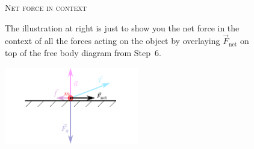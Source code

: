 \documentclass[10pt,letterpaper,twoside]{article}
\begin{document}
\FloatBarrier
\begin{figure}[h!]
  \begin{minipage}[l]{0.70\textwidth}
	{\Large\textsc{Net force in context}}{\quad}

	The illustration at right is just to show you the net force in the context of all the forces acting on the object by overlaying $\vec F_{\text{net}}$ on top of the free body diagram from Step~6.
  \end{minipage}
  \begin{minipage}[c]{0.25\textwidth}
	\includegraphics[keepaspectratio=true,width=2.30in]{./how_to_normal_force_and_friction_f11.pdf}
    \label{fig:11}
  \end{minipage}
\end{figure}
\FloatBarrier

\end{document}
